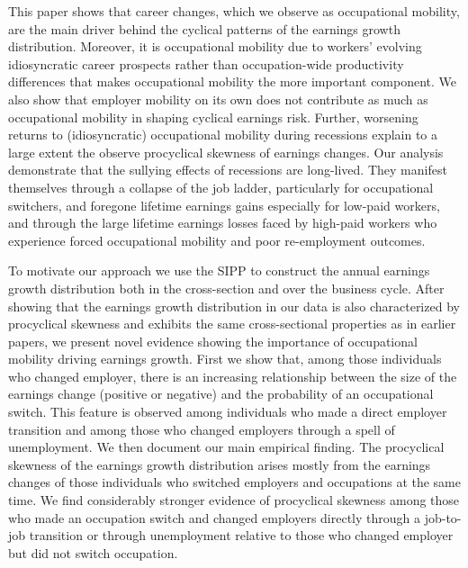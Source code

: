 \documentclass[12pt]{article}
\theoremstyle{definition}
\begin{document}
This paper shows that career changes, which we observe as occupational mobility, are the main driver behind the cyclical patterns of the earnings growth distribution. Moreover, it is occupational mobility due to workers' evolving idiosyncratic career prospects rather than occupation-wide productivity differences that makes occupational mobility the more important component. We also show that employer mobility on its own does not contribute as much as occupational mobility in shaping cyclical earnings risk. Further, worsening returns to (idiosyncratic) occupational mobility during recessions explain to a large extent the observe procyclical skewness of earnings changes. Our analysis demonstrate that the sullying effects of recessions are long-lived. They manifest themselves through a collapse of the job ladder, particularly for occupational switchers, and foregone lifetime earnings gains especially for low-paid workers, and through the large lifetime earnings losses faced by high-paid workers who experience forced occupational mobility and poor re-employment outcomes.

To motivate our approach we use the SIPP to construct the annual earnings growth distribution both in the cross-section and over the business cycle. After showing that the earnings growth distribution in our data is also characterized by procyclical skewness and exhibits the same cross-sectional properties as in earlier papers, we present novel evidence showing the importance of occupational mobility driving earnings growth. First we show that, among those individuals who changed employer, there is an increasing relationship between the size of the earnings change (positive or negative) and the probability of an occupational switch. This feature is observed among individuals who made a direct employer transition and among those who changed employers through a spell of unemployment. We then document our main empirical finding. The procyclical skewness of the earnings growth distribution arises mostly from the earnings changes of those individuals who switched employers and occupations at the same time. We find considerably stronger evidence of procyclical skewness among those who made an occupation switch and changed employers directly through a job-to-job transition or through unemployment relative to those who changed employer but did not switch occupation.
\end{document}
